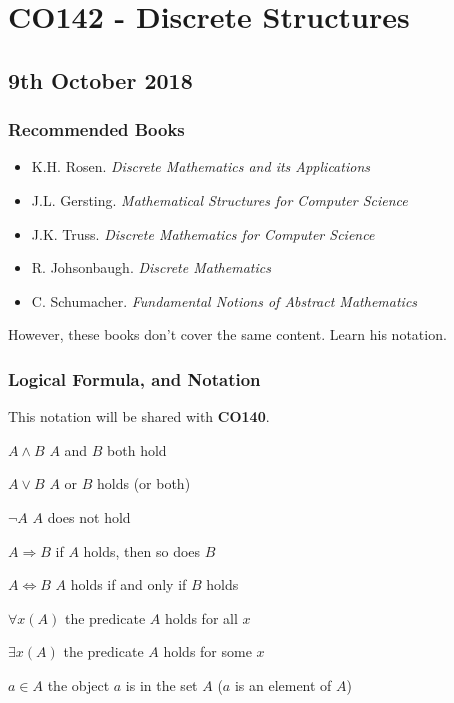 \documentclass[a4paper, 12pt]{article}
\begin{document}
        \section*{CO142 - Discrete Structures}
        \subsection*{9th October 2018}
        \subsubsection*{Recommended Books}
        \begin{itemize}
            \item K.H. Rosen. \textit{Discrete Mathematics and its Applications}
            \item J.L. Gersting. \textit{Mathematical Structures for Computer Science}
            \item J.K. Truss. \textit{Discrete Mathematics for Computer Science}
            \item R. Johsonbaugh. \textit{Discrete Mathematics}
            \item C. Schumacher. \textit{Fundamental Notions of Abstract Mathematics}
        \end{itemize}
        However, these books don't cover the same content. Learn his notation.
        \subsubsection*{Logical Formula, and Notation}
        This notation will be shared with \textbf{CO140}.
        \medskip

        $A \land B$ \hfill $A$ and $B$ both hold
        \smallskip

        $A \lor B$ \hfill $A$ or $B$ holds (or both)
        \smallskip

        $\neg A$ \hfill $A$ does not hold
        \smallskip

        $A \Rightarrow B$ \hfill if $A$ holds, then so does $B$
        \smallskip

        $A \Leftrightarrow B$ \hfill $A$ holds if and only if $B$ holds
        \smallskip

        $\forall x (A)$ \hfill the predicate $A$ holds for all $x$
        \smallskip

        $\exists x (A)$ \hfill the predicate $A$ holds for some $x$
        \smallskip

        $a \in A$ \hfill the object $a$ is in the set $A$ ($a$ is an element of $A$)
        \smallskip
\end{document}
